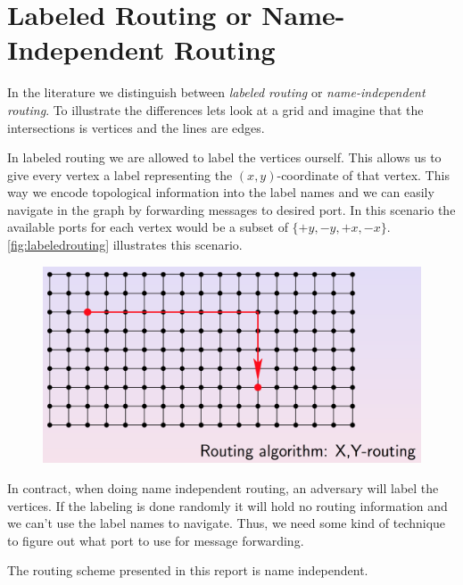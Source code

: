 \section*{Labeled Routing or Name-Independent Routing}
In the literature we distinguish between \emph{labeled routing} or
\emph{name-independent routing}. To illustrate the differences lets look at a
grid and imagine that the intersections is vertices and the lines are edges.

In labeled routing we are allowed to label the vertices ourself. This allows
us to give every vertex a label representing the $(x,y)$-coordinate of that
vertex. This way we encode topological information into the label names and we
can easily navigate in the graph by forwarding messages to desired port. In
this scenario the available ports for each vertex would be a subset of $\{+y,
-y, +x, -x\}$. \autoref{fig:labeledrouting} illustrates this scenario.
\begin{figure}[htbp]
    \centering
    \includegraphics[scale=0.3]{images/xyrouting.png} 
    \label{fig:labeledrouting}
\end{figure}

In contract, when doing name independent routing, an adversary will label the
vertices. If the labeling is done randomly it will hold no routing information
and we can't use the label names to navigate. Thus, we need some kind of
technique to figure out what port to use for message forwarding. 

The routing scheme presented in this report is name independent.
